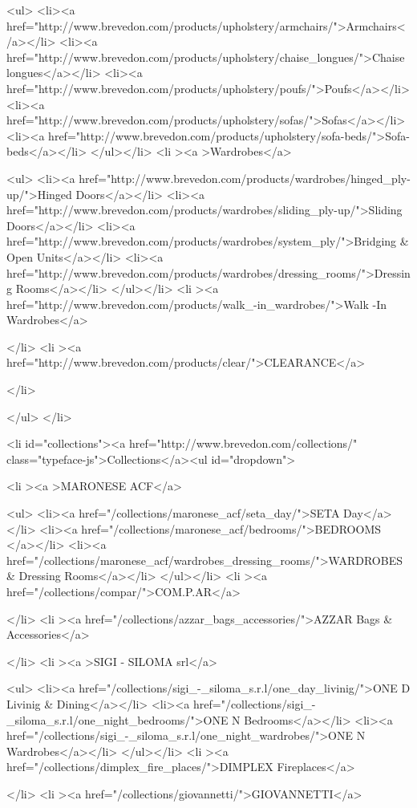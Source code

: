 	<ul>	<li><a  href="http://www.brevedon.com/products/upholstery/armchairs/">Armchairs</a></li>
		<li><a  href="http://www.brevedon.com/products/upholstery/chaise_longues/">Chaise longues</a></li>
		<li><a  href="http://www.brevedon.com/products/upholstery/poufs/">Poufs</a></li>
		<li><a  href="http://www.brevedon.com/products/upholstery/sofas/">Sofas</a></li>
		<li><a  href="http://www.brevedon.com/products/upholstery/sofa-beds/">Sofa-beds</a></li>
	</ul></li>
	<li ><a >Wardrobes</a>
	
	<ul>	<li><a  href="http://www.brevedon.com/products/wardrobes/hinged_ply-up/">Hinged Doors</a></li>
		<li><a  href="http://www.brevedon.com/products/wardrobes/sliding_ply-up/">Sliding Doors</a></li>
		<li><a  href="http://www.brevedon.com/products/wardrobes/system_ply/">Bridging & Open Units</a></li>
		<li><a  href="http://www.brevedon.com/products/wardrobes/dressing_rooms/">Dressing  Rooms</a></li>
	</ul></li>
	<li ><a href="http://www.brevedon.com/products/walk_-in_wardrobes/">Walk -In Wardrobes</a>
	
	</li>
	<li ><a href="http://www.brevedon.com/products/clear/">CLEARANCE</a>
	
	</li>
		
</ul>
</li>

				<li id="collections"><a href="http://www.brevedon.com/collections/" class="typeface-js">Collections</a><ul id="dropdown">


	<li ><a >MARONESE ACF</a>
	
	<ul>	<li><a  href="/collections/maronese_acf/seta_day/">SETA Day</a></li>
		<li><a  href="/collections/maronese_acf/bedrooms/">BEDROOMS </a></li>
		<li><a  href="/collections/maronese_acf/wardrobes_dressing_rooms/">WARDROBES & Dressing Rooms</a></li>
	</ul></li>
	<li ><a href="/collections/compar/">COM.P.AR</a>
	
	</li>
	<li ><a href="/collections/azzar_bags_accessories/">AZZAR Bags & Accessories</a>
	
	</li>
	<li ><a >SIGI - SILOMA srl</a>
	
	<ul>	<li><a  href="/collections/sigi_-_siloma_s.r.l/one_day_livinig/">ONE D Livinig & Dining</a></li>
		<li><a  href="/collections/sigi_-_siloma_s.r.l/one_night_bedrooms/">ONE N Bedrooms</a></li>
		<li><a  href="/collections/sigi_-_siloma_s.r.l/one_night_wardrobes/">ONE N Wardrobes</a></li>
	</ul></li>
	<li ><a href="/collections/dimplex_fire_places/">DIMPLEX Fireplaces</a>
	
	</li>
	<li ><a href="/collections/giovannetti/">GIOVANNETTI</a>
	
